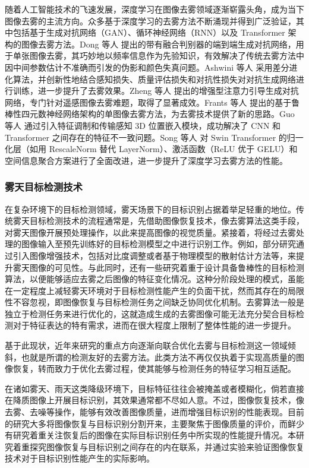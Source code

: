随着人工智能技术的飞速发展，深度学习在图像去雾领域逐渐崭露头角，成为当下图像去雾的主流方向。众多基于深度学习的去雾方法不断涌现并得到广泛验证，其中包括基于生成对抗网络（GAN）、循环神经网络（RNN）以及 Transformer 架构的图像去雾方法。Dong 等人 \cite{dong2020fd} 提出的带有融合判别器的端到端生成对抗网络，用于单张图像去雾，其巧妙地以频率信息作为先验知识，有效解决了传统去雾方法中因中间参数估计不准确而引发的伪影和颜色失真问题。Ashwini 等人 \cite{ashwini2024epq} 采用差分进化算法，并创新性地结合感知损失、质量评估损失和对抗性损失对对抗生成网络进行训练，进一步提升了去雾效果。Zheng 等人 \cite{zheng2022dehaze} 提出的增强型注意力引导生成对抗网络，专门针对遥感图像去雾难题，取得了显著成效。Frants 等人 \cite{frants2023qcnn} 提出的基于鲁棒性四元数神经网络架构的单图像去雾方法，为去雾技术提供了新的思路。Guo 等人 \cite{guo2022image} 通过引入特征调制和传输感知 3D 位置嵌入模块，成功解决了 CNN 和 Transformer 之间存在的特征不一致问题。Song 等人 \cite{song2023vision} 对 Swin Transformer 的归一化层（如用 RescaleNorm 替代 LayerNorm）、激活函数（ReLU 优于 GELU）和空间信息聚合方案进行了全面改进，进一步提升了深度学习去雾方法的性能。

\subsubsection{雾天目标检测技术}

在复杂环境下的目标检测领域，雾天场景下的目标识别占据着举足轻重的地位。传统雾天目标检测技术的流程通常是，先借助图像恢复技术，像去雾算法这类手段，对雾天图像开展预处理操作，以此来提高图像的视觉质量。紧接着，将经过去雾处理的图像输入至预先训练好的目标检测模型之中进行识别工作。例如，部分研究通过引入图像增强技术，包括对比度调整或者基于物理模型的散射估计方法等，来提升雾天图像的可见性。与此同时，还有一些研究着重于设计具备鲁棒性的目标检测算法，以便能够适应去雾之后图像的特征变化情况。这种分阶段处理的模式，虽能在一定程度上减轻雾天环境对于目标检测性能产生的负面干扰，然而其存在的局限性不容忽视，即图像恢复与目标检测任务之间缺乏协同优化机制。去雾算法一般是独立于检测任务来进行优化的，这就造成生成的去雾图像可能无法充分契合目标检测对于特征表达的特有需求，进而在很大程度上限制了整体性能的进一步提升。

基于此现状，近年来研究的重点方向逐渐向联合优化去雾与目标检测这一领域倾斜\cite{liu2024oriented, liu2024approach, zhang2020unified}，也就是所谓的检测友好的去雾方法。此类方法不再仅仅执着于实现高质量的图像恢复，转而致力于优化去雾过程，使其能够与检测任务的特征学习相互适配。

在诸如雾天、雨天这类降级环境下，目标特征往往会被掩盖或者模糊化，倘若直接在降质图像上开展目标识别，其效果通常都不尽如人意\cite{freire2024beyond}。不过，图像恢复技术，像去雾、去噪等操作，能够有效改善图像质量，进而增强目标识别的性能表现。目前的研究大多将图像恢复与目标识别分割开来，主要聚焦于图像质量的评价，而鲜少有研究着重关注恢复后的图像在实际目标识别任务中所实现的性能提升情况。本研究着重探究图像恢复与目标识别之间存在的内在联系，并通过实验来验证图像恢复技术对于目标识别性能产生的实际影响。

